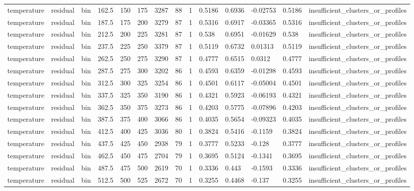 \begin{table}[htbp]
\begin{tabular}{llllllllllllll}
temperature & residual & bin & 162.5 & 150 & 175 & 3287 & 88 & 1 & 0.5186 & 0.6936 & -0.02753 & 0.5186 & insufficient\_clusters\_or\_profiles \\
temperature & residual & bin & 187.5 & 175 & 200 & 3279 & 87 & 1 & 0.5316 & 0.6917 & -0.03365 & 0.5316 & insufficient\_clusters\_or\_profiles \\
temperature & residual & bin & 212.5 & 200 & 225 & 3281 & 87 & 1 & 0.538 & 0.6951 & -0.01629 & 0.538 & insufficient\_clusters\_or\_profiles \\
temperature & residual & bin & 237.5 & 225 & 250 & 3379 & 87 & 1 & 0.5119 & 0.6732 & 0.01313 & 0.5119 & insufficient\_clusters\_or\_profiles \\
temperature & residual & bin & 262.5 & 250 & 275 & 3290 & 87 & 1 & 0.4777 & 0.6515 & 0.0312 & 0.4777 & insufficient\_clusters\_or\_profiles \\
temperature & residual & bin & 287.5 & 275 & 300 & 3202 & 86 & 1 & 0.4593 & 0.6359 & -0.01298 & 0.4593 & insufficient\_clusters\_or\_profiles \\
temperature & residual & bin & 312.5 & 300 & 325 & 3254 & 86 & 1 & 0.4501 & 0.6117 & -0.05004 & 0.4501 & insufficient\_clusters\_or\_profiles \\
temperature & residual & bin & 337.5 & 325 & 350 & 3190 & 86 & 1 & 0.4321 & 0.5923 & -0.06193 & 0.4321 & insufficient\_clusters\_or\_profiles \\
temperature & residual & bin & 362.5 & 350 & 375 & 3273 & 86 & 1 & 0.4203 & 0.5775 & -0.07896 & 0.4203 & insufficient\_clusters\_or\_profiles \\
temperature & residual & bin & 387.5 & 375 & 400 & 3066 & 86 & 1 & 0.4035 & 0.5654 & -0.09323 & 0.4035 & insufficient\_clusters\_or\_profiles \\
temperature & residual & bin & 412.5 & 400 & 425 & 3036 & 80 & 1 & 0.3824 & 0.5416 & -0.1159 & 0.3824 & insufficient\_clusters\_or\_profiles \\
temperature & residual & bin & 437.5 & 425 & 450 & 2938 & 79 & 1 & 0.3777 & 0.5233 & -0.128 & 0.3777 & insufficient\_clusters\_or\_profiles \\
temperature & residual & bin & 462.5 & 450 & 475 & 2704 & 79 & 1 & 0.3695 & 0.5124 & -0.1341 & 0.3695 & insufficient\_clusters\_or\_profiles \\
temperature & residual & bin & 487.5 & 475 & 500 & 2619 & 70 & 1 & 0.3336 & 0.443 & -0.1593 & 0.3336 & insufficient\_clusters\_or\_profiles \\
temperature & residual & bin & 512.5 & 500 & 525 & 2672 & 70 & 1 & 0.3255 & 0.4468 & -0.137 & 0.3255 & insufficient\_clusters\_or\_profiles \\

\end{tabular}
\end{table}
